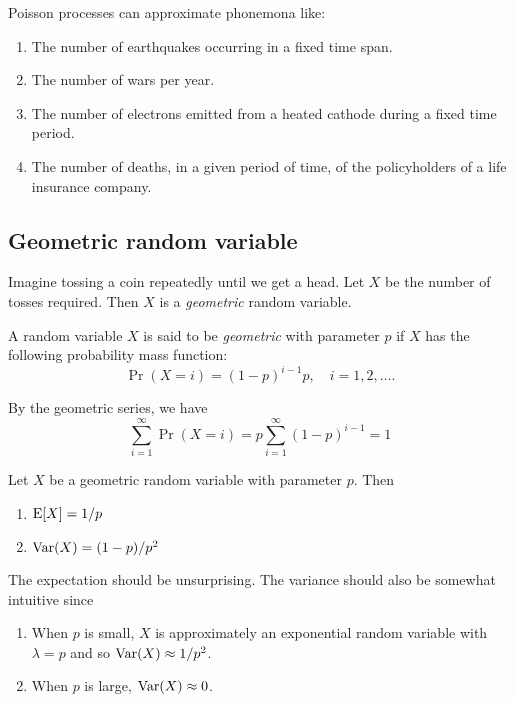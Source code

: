 \documentclass{article}
\begin{document}
\begin{example}
  Poisson processes can approximate phonemona like:
  \begin{enumerate}
    \item The number of earthquakes occurring in a fixed time span.
    \item The number of wars per year.
    \item The number of electrons emitted from a heated cathode during a fixed time period.
    \item The number of deaths, in a given period of time, of the policyholders of a life insurance company.
  \end{enumerate}
\end{example}

\subsection{Geometric random variable}

Imagine tossing a coin repeatedly until we get a head.
Let $X$ be the number of tosses required.
Then $X$ is a \emph{geometric} random variable.

\begin{definition}
  A random variable $X$ is said to be \emph{geometric} with parameter $p$ if $X$ has the following probability mass function:
  \[
    \Pr(X = i) = (1 - p)^{i - 1} p, \quad i = 1, 2, \ldots.
  \]
\end{definition}

\begin{remark}
  By the geometric series, we have
  \[
    \sum\limits_{i = 1}^\infty \Pr(X = i) = p \sum\limits_{i = 1}^\infty (1 - p)^{i - 1} = 1
  \]
\end{remark}

\begin{proposition}
  Let $X$ be a geometric random variable with parameter $p$.
  Then
  \begin{enumerate}
    \item $\operatorname{E}[X] = 1/p$
    \item $\operatorname{Var}(X) = (1 - p)/p^2$
  \end{enumerate}
\end{proposition}
The expectation should be unsurprising.
The variance should also be somewhat intuitive since
\begin{enumerate}
  \item When $p$ is small, $X$ is approximately an exponential random variable with $\lambda = p$ and so $\operatorname{Var}(X) \approx 1/p^2$.
  \item When $p$ is large, $\operatorname{Var}(X) \approx 0$.
\end{enumerate}
\end{document}
